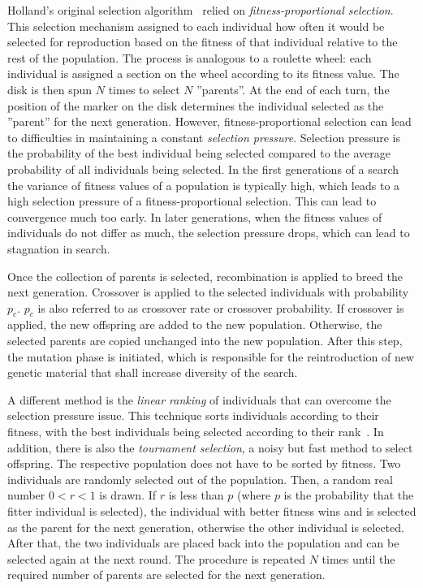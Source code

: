 \documentclass[paper=a4,%
  twoside,%
  BCOR4mm,%
  abstract=true,%
  toc=bibliography,%
  chapterprefix=true,%
  toc=bibliographynumbered,%
  open=right,%
  english,%
  pagesize=pdftex]{scrreprt}
\begin{document}
Holland's original selection algorithm~\cite{Holland1992} relied on \textit{fitness-proportional selection}. This selection mechanism assigned to each individual how often it would be selected for reproduction based on the fitness of that individual relative to the rest of the population. The process is analogous to a roulette wheel: each individual is assigned a section on the wheel according to its fitness value. The disk is then spun $N$ times to select $N$ ''parents''. At the end of each turn, the position of the marker on the disk determines the individual selected as the ''parent'' for the next generation. However, fitness-proportional selection can lead to difficulties in maintaining a constant \textit{selection pressure}. Selection pressure is the probability of the best individual being selected compared to the average probability of all individuals being selected. In the first generations of a search the variance of fitness values of a population is typically high, which leads to a high selection pressure of a fitness-proportional selection. This can lead to convergence much too early. In later generations, when the fitness values of individuals do not differ as much, the selection pressure drops, which can lead to stagnation in search.

Once the collection of parents is selected, recombination is applied to breed the next generation. Crossover is applied to the selected individuals with probability $p_c$. $p_c$ is also referred to as crossover rate or crossover probability. If crossover is applied, the new offspring are added to the new population. Otherwise, the selected parents are copied unchanged into the new population. After this step, the mutation phase is initiated, which is responsible for the reintroduction of new genetic material that shall increase diversity of the search.

A different method is the \textit{linear ranking} of individuals that can overcome the selection pressure issue. This technique sorts individuals according to their fitness, with the best individuals being selected according to their rank~\cite{whitley1989genitor}. In addition, there is also the \textit{tournament selection}, a noisy but fast method to select offspring. The respective population does not have to be sorted by fitness. Two individuals are randomly selected out of the population. Then, a random real number $0 < r < 1$ is drawn. If $r$ is less than $p$ (where $p$ is the probability that the fitter individual is selected), the individual with better fitness wins and is selected as the parent for the next generation, otherwise the other individual is selected. After that, the two individuals are placed back into the population and can be selected again at the next round. The procedure is repeated $N$ times until the required number of parents are selected for the next generation.
\end{document}
